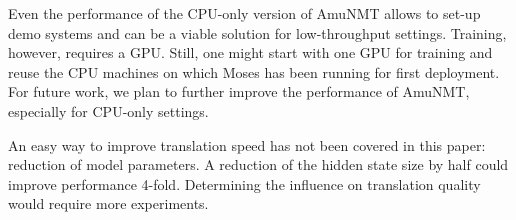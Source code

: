 \documentclass[11pt]{article}
\begin{document}
Even the performance of the CPU-only version of AmuNMT allows to set-up demo systems and can be a viable solution for low-throughput settings. Training, however, requires a GPU. Still, one might start with one GPU for training and reuse the CPU machines on which Moses has been running  for first deployment. For future work, we plan to further improve the performance of AmuNMT, especially for CPU-only settings.

An easy way to improve translation speed has not been covered in this paper: reduction of model parameters. A reduction of the hidden state size by half could improve performance 4-fold. Determining the influence on translation quality would require more experiments.





\end{document}
